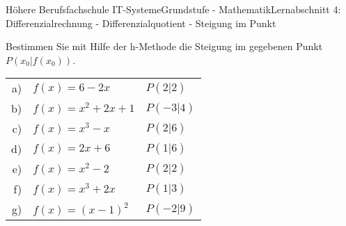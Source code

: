 \documentclass[oneside,openany,headings=optiontotoc,11pt,numbers=noenddot]{scrreprt}
\begin{document}
	\begin{worksheet}{Höhere Berufsfachschule IT-Systeme}{Grundstufe - Mathematik}{Lernabschnitt 4: Differenzialrechnung - Differenzialquotient - Steigung im Punkt}
		\begin{framed}
			\noindent
			Bestimmen Sie mit Hilfe der h-Methode die Steigung im gegebenen Punkt \(P(x_0|f(x_0))\).\\
			\par\noindent
			\renewcommand{\arraystretch}{1.5}
			\begin{tabularx}{\textwidth}{rll}
				a) & \(f(x) = 6 - 2x\) & \(P(2|2)\)\\
				b) & \(f(x) = x^2 + 2x + 1\) & \(P(-3|4)\)\\
				c) & \(f(x) = x^3 - x\) & \(P(2|6)\)\\
				d) & \(f(x) = 2x + 6\) &\(P(1|6)\)\\
				e) & \(f(x) = x^2 - 2\) & \(P(2|2)\)\\
				f) & \(f(x) = x^3 +2x\) & \(P(1|3)\)\\
				g) & \(f(x) = (x-1)^2\) & \(P(-2|9)\)\\
				
			\end{tabularx}
		\end{framed}
	\end{worksheet}
\end{document}
